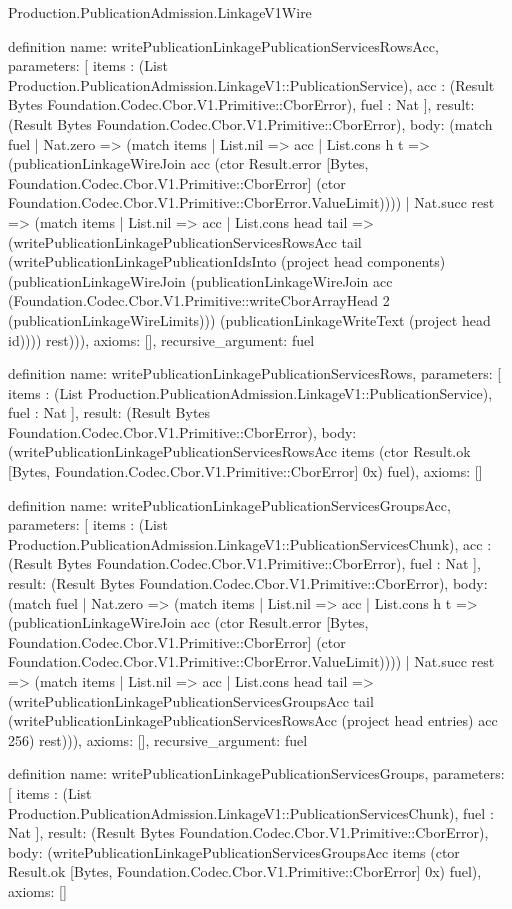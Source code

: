 \begin{lexlean}{Production.PublicationAdmission.LinkageV1Wire}
\begin{semanticmodule}
definition{
  name: writePublicationLinkagePublicationServicesRowsAcc,
  parameters: [
    items : (List Production.PublicationAdmission.LinkageV1::PublicationService),
    acc : (Result Bytes Foundation.Codec.Cbor.V1.Primitive::CborError),
    fuel : Nat
  ],
  result: (Result Bytes Foundation.Codec.Cbor.V1.Primitive::CborError),
  body: (match fuel
    | Nat.zero => (match items
      | List.nil => acc
      | List.cons h t => (publicationLinkageWireJoin acc (ctor Result.error [Bytes, Foundation.Codec.Cbor.V1.Primitive::CborError] (ctor Foundation.Codec.Cbor.V1.Primitive::CborError.ValueLimit))))
    | Nat.succ rest => (match items
      | List.nil => acc
      | List.cons head tail => (writePublicationLinkagePublicationServicesRowsAcc tail (writePublicationLinkagePublicationIdsInto (project head components) (publicationLinkageWireJoin (publicationLinkageWireJoin acc (Foundation.Codec.Cbor.V1.Primitive::writeCborArrayHead 2 (publicationLinkageWireLimits))) (publicationLinkageWriteText (project head id)))) rest))),
  axioms: [],
  recursive_argument: fuel
}

definition{
  name: writePublicationLinkagePublicationServicesRows,
  parameters: [
    items : (List Production.PublicationAdmission.LinkageV1::PublicationService),
    fuel : Nat
  ],
  result: (Result Bytes Foundation.Codec.Cbor.V1.Primitive::CborError),
  body: (writePublicationLinkagePublicationServicesRowsAcc items (ctor Result.ok [Bytes, Foundation.Codec.Cbor.V1.Primitive::CborError] 0x) fuel),
  axioms: []
}

definition{
  name: writePublicationLinkagePublicationServicesGroupsAcc,
  parameters: [
    items : (List Production.PublicationAdmission.LinkageV1::PublicationServicesChunk),
    acc : (Result Bytes Foundation.Codec.Cbor.V1.Primitive::CborError),
    fuel : Nat
  ],
  result: (Result Bytes Foundation.Codec.Cbor.V1.Primitive::CborError),
  body: (match fuel
    | Nat.zero => (match items
      | List.nil => acc
      | List.cons h t => (publicationLinkageWireJoin acc (ctor Result.error [Bytes, Foundation.Codec.Cbor.V1.Primitive::CborError] (ctor Foundation.Codec.Cbor.V1.Primitive::CborError.ValueLimit))))
    | Nat.succ rest => (match items
      | List.nil => acc
      | List.cons head tail => (writePublicationLinkagePublicationServicesGroupsAcc tail (writePublicationLinkagePublicationServicesRowsAcc (project head entries) acc 256) rest))),
  axioms: [],
  recursive_argument: fuel
}

definition{
  name: writePublicationLinkagePublicationServicesGroups,
  parameters: [
    items : (List Production.PublicationAdmission.LinkageV1::PublicationServicesChunk),
    fuel : Nat
  ],
  result: (Result Bytes Foundation.Codec.Cbor.V1.Primitive::CborError),
  body: (writePublicationLinkagePublicationServicesGroupsAcc items (ctor Result.ok [Bytes, Foundation.Codec.Cbor.V1.Primitive::CborError] 0x) fuel),
  axioms: []
}


\end{semanticmodule}
\end{lexlean}
